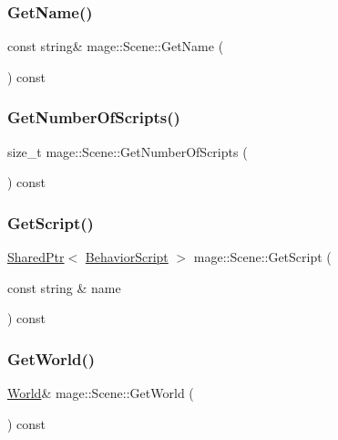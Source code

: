 \subsubsection{\texorpdfstring{Get\+Name()}{GetName()}}
{\footnotesize\ttfamily const string\& mage\+::\+Scene\+::\+Get\+Name (\begin{DoxyParamCaption}{ }\end{DoxyParamCaption}) const}

\hypertarget{classmage_1_1_scene_a799ac8ddd90d24f6c3c208942e4f159c}{}\label{classmage_1_1_scene_a799ac8ddd90d24f6c3c208942e4f159c} 
\subsubsection{\texorpdfstring{Get\+Number\+Of\+Scripts()}{GetNumberOfScripts()}}
{\footnotesize\ttfamily size\+\_\+t mage\+::\+Scene\+::\+Get\+Number\+Of\+Scripts (\begin{DoxyParamCaption}{ }\end{DoxyParamCaption}) const}

\hypertarget{classmage_1_1_scene_aa5d10620d1cf62ba268095f7a2cd2191}{}\label{classmage_1_1_scene_aa5d10620d1cf62ba268095f7a2cd2191} 
\subsubsection{\texorpdfstring{Get\+Script()}{GetScript()}}
{\footnotesize\ttfamily \hyperlink{namespacemage_a1e01ae66713838a7a67d30e44c67703e}{Shared\+Ptr}$<$ \hyperlink{classmage_1_1_behavior_script}{Behavior\+Script} $>$ mage\+::\+Scene\+::\+Get\+Script (\begin{DoxyParamCaption}\item[{const string \&}]{name }\end{DoxyParamCaption}) const}

\hypertarget{classmage_1_1_scene_a0365a6a2e83519ad33280cc607408b4a}{}\label{classmage_1_1_scene_a0365a6a2e83519ad33280cc607408b4a} 
\subsubsection{\texorpdfstring{Get\+World()}{GetWorld()}}
{\footnotesize\ttfamily \hyperlink{classmage_1_1_world}{World}\& mage\+::\+Scene\+::\+Get\+World (\begin{DoxyParamCaption}{ }\end{DoxyParamCaption}) const}

